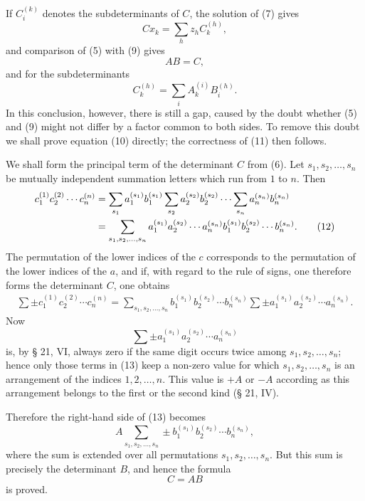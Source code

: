 \documentclass[11pt]{article}
\begin{document}
If $C_i^{(k)}$ denotes the subdeterminants of $C$, the solution of (7) gives
\begin{equation}
 Cx_k=\sum_h z_h C_k^{(h)},\tag{9}
\end{equation}
and comparison of (5) with (9) gives
\begin{equation}
 AB=C,\tag{10}
\end{equation}
and for the subdeterminants
\begin{equation}
 C_k^{(h)}=\sum_i A_k^{(i)}B_i^{(h)}.\tag{11}
\end{equation}
In this conclusion, however, there is still a gap, caused by the doubt whether (5) and (9) might not differ by a factor common to both sides. To remove this doubt we shall prove equation (10) directly; the correctness of (11) then follows.

We shall form the principal term of the determinant $C$ from (6). Let $s_1,s_2,\ldots,s_n$ be mutually independent summation letters which run from $1$ to $n$. Then
\begin{align}
 c_1^{(1)}c_2^{(2)}\cdots c_n^{(n)}
 &=\sum_{s_1}a_1^{(s_1)}b_1^{(s_1)}
   \sum_{s_2}a_2^{(s_2)}b_2^{(s_2)}\cdots
   \sum_{s_n}a_n^{(s_n)}b_n^{(s_n)}\notag\\
 &=\sum_{s_1,s_2,\ldots,s_n}a_1^{(s_1)}a_2^{(s_2)}\cdots a_n^{(s_n)}
 b_1^{(s_1)}b_2^{(s_2)}\cdots b_n^{(s_n)}.\tag{12}
\end{align}
The permutation of the lower indices of the $c$ corresponds to the permutation of the lower indices of the $a$, and if, with regard to the rule of signs, one therefore forms the determinant $C$, one obtains
\begin{align}
 \sum \pm c_1^{(1)}c_2^{(2)}\cdots c_n^{(n)}
 =\sum_{s_1,s_2,\ldots,s_n} b_1^{(s_1)}b_2^{(s_2)}\cdots b_n^{(s_n)}
 \sum\pm a_1^{(s_1)}a_2^{(s_2)}\cdots a_n^{(s_n)}.\tag{13}
\end{align}
Now
\[
\sum\pm a_1^{(s_1)}a_2^{(s_2)}\cdots a_n^{(s_n)}
\]
is, by § 21, VI, always zero if the same digit occurs twice among $s_1,s_2,
\ldots,s_n$; hence only those terms in (13) keep a non-zero value for which $s_1,s_2,
\ldots,s_n$ is an arrangement of the indices $1,2,
\ldots,n$. This value is $+A$ or $-A$ according as this arrangement belongs to the first or the second kind (§ 21, IV).

Therefore the right-hand side of (13) becomes
\[
 A\sum_{s_1,s_2,\ldots,s_n}\pm b_1^{(s_1)}b_2^{(s_2)}\cdots b_n^{(s_n)},
\]
where the sum is extended over all permutations $s_1,s_2,
\ldots,s_n$. But this sum is precisely the determinant $B$, and hence the formula
\[
 C=AB
\]
is proved.
\end{document}
